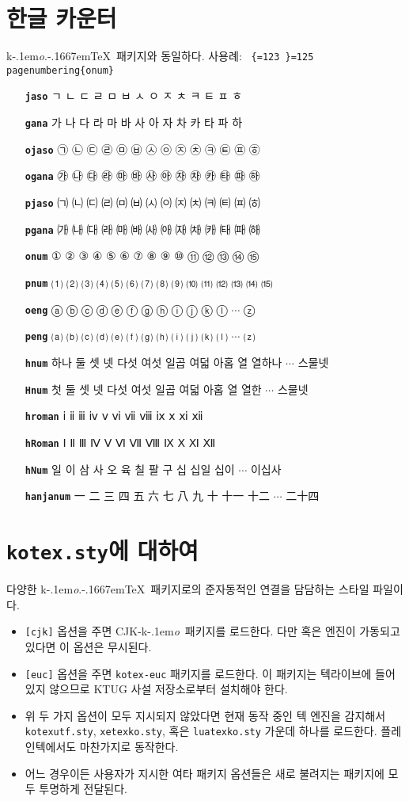 \documentclass[dvipdfmx,b5paper]{article}
\def\cs#1{\texttt{\color{teal}\char92 \chardef\{=123 \chardef\}=125 #1}}
\def\koTeX{\textsf{k}\kern-.1em\textit{o}.\kern-.1667em\TeX}
\def\cjkko{\mbox{CJK-\textsf{k}\kern-.1em\textit{o}}}
\begin{document}
\section{한글 카운터}
\koTeX\ 패키지와 동일하다. 사용례: \cs{pagenumbering\{onum\}}
\begin{itemize}\leftskip=1cm =1em \itemsep=0pt plus0pt
      \def\cs#1{\texttt{\bfseries #1}}
  \item[\cs{jaso}] ㄱ ㄴ ㄷ ㄹ ㅁ ㅂ ㅅ ㅇ ㅈ ㅊ ㅋ ㅌ ㅍ ㅎ
  \item[\cs{gana}] 가 나 다 라 마 바 사 아 자 차 카 타 파 하
  \item[\cs{ojaso}] ㉠ ㉡ ㉢ ㉣ ㉤ ㉥ ㉦ ㉧ ㉨ ㉩ ㉪ ㉫ ㉬ ㉭
  \item[\cs{ogana}] ㉮ ㉯ ㉰ ㉱ ㉲ ㉳ ㉴ ㉵ ㉶ ㉷ ㉸ ㉹ ㉺ ㉻
  \item[\cs{pjaso}] ㈀ ㈁ ㈂ ㈃ ㈄ ㈅ ㈆ ㈇ ㈈ ㈉ ㈊ ㈋ ㈌ ㈍
  \item[\cs{pgana}] ㈎ ㈏ ㈐ ㈑ ㈒ ㈓ ㈔ ㈕ ㈖ ㈗ ㈘ ㈙ ㈚ ㈛
  \item[\cs{onum}]  ① ② ③ ④ ⑤ ⑥ ⑦ ⑧ ⑨ ⑩ ⑪ ⑫ ⑬ ⑭ ⑮
  \item[\cs{pnum}] ⑴ ⑵ ⑶ ⑷ ⑸ ⑹ ⑺ ⑻ ⑼ ⑽ ⑾ ⑿ ⒀ ⒁ ⒂
  \item[\cs{oeng}] ⓐ ⓑ ⓒ ⓓ ⓔ ⓕ ⓖ ⓗ ⓘ ⓙ ⓚ ⓛ $\cdots$ ⓩ
  \item[\cs{peng}] ⒜ ⒝ ⒞ ⒟ ⒠ ⒡ ⒢ ⒣ ⒤ ⒥ ⒦ ⒧ $\cdots$ ⒵
  \item[\cs{hnum}] 하나 둘 셋 넷 다섯 여섯 일곱 여덟 아홉 열 열하나 $\cdots$ 스물넷
  \item[\cs{Hnum}] 첫 둘 셋 넷 다섯 여섯 일곱 여덟 아홉 열 열한 $\cdots$ 스물넷
  \item[\cs{hroman}] ⅰ ⅱ ⅲ ⅳ ⅴ ⅵ ⅶ ⅷ ⅸ ⅹ ⅺ ⅻ
  \item[\cs{hRoman}] Ⅰ Ⅱ Ⅲ Ⅳ Ⅴ Ⅵ Ⅶ Ⅷ Ⅸ Ⅹ Ⅺ Ⅻ
  \item[\cs{hNum}] 일 이 삼 사 오 육 칠 팔 구 십 십일 십이 $\cdots$ 이십사
  \item[\cs{hanjanum}] 一 二 三 四 五 六 七 八 九 十 十一 十二 $\cdots$ 二十四
\end{itemize}

\section{\texttt{kotex.sty}에 대하여}
다양한 \koTeX\ 패키지로의 준자동적인 연결을 담담하는 스타일 파일이다.
\begin{itemize}
  \item \verb|[cjk]| 옵션을 주면 \cjkko\ 패키지를 로드한다.
    다만  혹은  엔진이 가동되고 있다면
    이 옵션은 무시된다.
  \item \verb|[euc]| 옵션을 주면 \verb|kotex-euc| 패키지를 로드한다.
    이 패키지는 텍라이브에 들어있지 않으므로 KTUG 사설 저장소로부터
    설치해야 한다.
  \item 위 두 가지 옵션이 모두 지시되지 않았다면 현재 동작 중인 텍 엔진을
    감지해서 \verb|kotexutf.sty|, \verb|xetexko.sty|, 혹은 \verb|luatexko.sty|
    가운데 하나를 로드한다.  플레인텍에서도 마찬가지로 동작한다.
  \item 어느 경우이든 사용자가 지시한 여타 패키지 옵션들은 새로 불려지는
    패키지에 모두 투명하게 전달된다.
\end{itemize}
\end{document}
